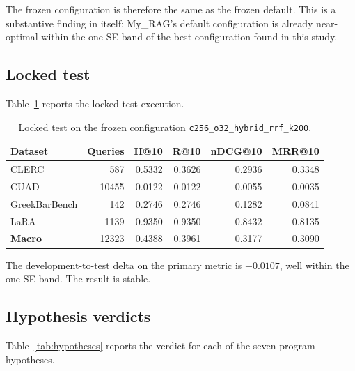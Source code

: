 \documentclass[11pt,a4paper]{article}
\begin{document}
The frozen configuration is therefore the same as the frozen
default. This is a substantive finding in itself: My\_RAG's default
configuration is already near-optimal within the one-SE band of the
best configuration found in this study.

\subsection{Locked test}
Table~\ref{tab:locked} reports the locked-test execution.

\begin{table}[h]
\centering
\caption{Locked test on the frozen configuration
\texttt{c256\_o32\_hybrid\_rrf\_k200}.}
\label{tab:locked}
\small
\begin{tabular}{l r r r r r}
\toprule
\textbf{Dataset} & \textbf{Queries} & \textbf{H@10} & \textbf{R@10}
  & \textbf{nDCG@10} & \textbf{MRR@10} \\
\midrule
CLERC              & \num{587}   & \num{0.5332} & \num{0.3626}
                   & \num{0.2936} & \num{0.3348} \\
CUAD               & \num{10455} & \num{0.0122} & \num{0.0122}
                   & \num{0.0055} & \num{0.0035} \\
GreekBarBench      & \num{142}   & \num{0.2746} & \num{0.2746}
                   & \num{0.1282} & \num{0.0841} \\
LaRA               & \num{1139}  & \num{0.9350} & \num{0.9350}
                   & \num{0.8432} & \num{0.8135} \\
\midrule
\textbf{Macro}     & \num{12323} & \num{0.4388} & \num{0.3961}
                   & \num{0.3177} & \num{0.3090} \\
\bottomrule
\end{tabular}
\end{table}

The development-to-test delta on the primary metric is
$\num{-0.0107}$, well within the one-SE band. The result is stable.

\subsection{Hypothesis verdicts}
Table~\ref{tab:hypotheses} reports the verdict for each of the seven
program hypotheses.
\end{document}

